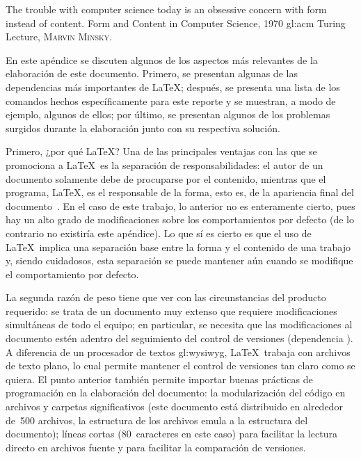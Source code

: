 %
%

{
  \epigrafe
  {%
    The trouble with computer science today is an obsessive concern with
    form instead of content.%
  }
  {%
    Form and Content in Computer Science, 1970 \acrshort{gl:acm} Turing Lecture,
    \textsc{Marvin Minsky}.%
  }
}

\noindent
En este apéndice se discuten algunos de los aspectos más relevantes de la
elaboración de este documento. Primero, se presentan algunas de las dependencias
más importantes de \LaTeX; después, se presenta una lista de los comandos hechos
específicamente para este reporte y se muestran, a modo de ejemplo, algunos de
ellos; por último, se presentan algunos de los problemas surgidos durante la
elaboración junto con su respectiva solución.

Primero, ¿por qué \LaTeX? Una de las principales ventajas con las que se
promociona a \LaTeX~es la separación de responsabilidades: el autor de un
documento solamente debe de procuparse por el contenido, mientras que el
programa, \LaTeX, es el responsable de la forma, esto es, de la apariencia
final del documento~\cite{introduccion_latex}. En el caso de este trabajo, lo
anterior no es enteramente cierto, pues hay un alto grado de modificaciones
sobre los comportamientos por defecto (de lo contrario no existiría este
apéndice). Lo que sí es cierto es que el uso de \LaTeX~implica una separación
base entre la forma y el contenido de una trabajo y, siendo cuidadosos, esta
separación se puede mantener aún cuando se modifique el comportamiento por
defecto.

La segunda razón de peso tiene que ver con las circunstancias del producto
requerido: se trata de un documento muy extenso que requiere modificaciones
simultáneas de todo el equipo; en particular, se necesita que las
modificaciones al documento estén adentro del seguimiento del control de
versiones (dependencia ). A diferencia de un procesador
de textos \gls{gl:wysiwyg}, \LaTeX~trabaja con archivos de texto plano, lo cual
permite mantener el control de versiones tan claro como se quiera. El punto
anterior también permite importar buenas prácticas de programación en la
elaboración del documento: la modularización del código en archivos y carpetas
significativos (este documento está distribuido en alrededor de~500 archivos,
la estructura de los archivos emula a la estructura del documento); líneas
cortas (80~caracteres en este caso) para facilitar la lectura directo en
archivos fuente y para facilitar la comparación de versiones.

